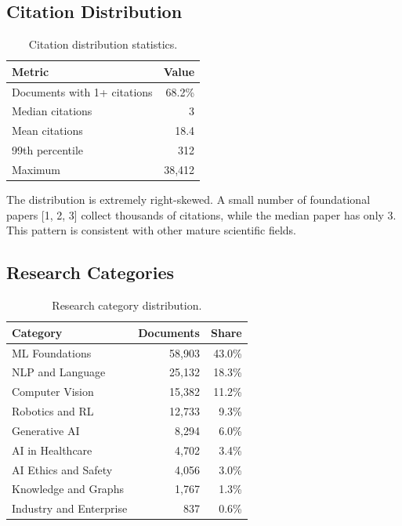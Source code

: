 \documentclass[11pt]{article}
\begin{document}
\subsection{Citation Distribution}

\begin{table}[h]
\centering
\caption{Citation distribution statistics.}
\label{tab:citations}
\begin{tabular}{@{}lr@{}}
\toprule
Metric & Value \\
\midrule
Documents with 1+ citations & 68.2\% \\
Median citations & 3 \\
Mean citations & 18.4 \\
99th percentile & 312 \\
Maximum & 38,412 \\
\bottomrule
\end{tabular}
\end{table}

The distribution is extremely right-skewed. A small number of foundational papers [1, 2, 3] collect thousands of citations, while the median paper has only 3. This pattern is consistent with other mature scientific fields.

\subsection{Research Categories}

\begin{table}[h]
\centering
\caption{Research category distribution.}
\label{tab:categories}
\begin{tabular}{@{}lrr@{}}
\toprule
Category & Documents & Share \\
\midrule
ML Foundations & 58,903 & 43.0\% \\
NLP and Language & 25,132 & 18.3\% \\
Computer Vision & 15,382 & 11.2\% \\
Robotics and RL & 12,733 & 9.3\% \\
Generative AI & 8,294 & 6.0\% \\
AI in Healthcare & 4,702 & 3.4\% \\
AI Ethics and Safety & 4,056 & 3.0\% \\
Knowledge and Graphs & 1,767 & 1.3\% \\
Industry and Enterprise & 837 & 0.6\% \\
\bottomrule
\end{tabular}
\end{table}
\end{document}
